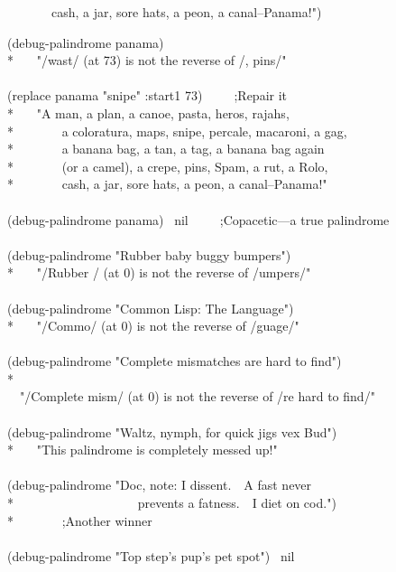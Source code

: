 \begin{newer}
\begin{lisp}
~~~~~~~cash, a jar, sore hats, a peon, a canal--Panama!")
\end{lisp}
\begin{lisp}
(debug-palindrome panama) \\*
~~\EV\ "/wast/ (at 73) is not the reverse of /, pins/" \\
\\
(replace panama "snipe" :start1 73)~~~~~;\textrm{Repair it} \\*
~~\EV\ "A man, a plan, a canoe, pasta, heros, rajahs, \\*
~~~~~~~a coloratura, maps, snipe, percale, macaroni, a gag, \\*
~~~~~~~a banana bag, a tan, a tag, a banana bag again \\*
~~~~~~~(or a camel), a crepe, pins, Spam, a rut, a Rolo, \\*
~~~~~~~cash, a jar, sore hats, a peon, a canal--Panama!" \\
\\
(debug-palindrome panama) \EV\ nil~~~~~;\textrm{Copacetic---a true palindrome} \\
\\
(debug-palindrome "Rubber baby buggy bumpers") \\*
~~\EV\ "/Rubber / (at 0) is not the reverse of /umpers/" \\
\\
(debug-palindrome "Common Lisp: The Language") \\*
~~\EV\ "/Commo/ (at 0) is not the reverse of /guage/" \\
\\
(debug-palindrome "Complete mismatches are hard to find") \\*
~~\EV\ \\
~~"/Complete mism/ (at 0) is not the reverse of /re hard to find/" \\
\\
(debug-palindrome "Waltz, nymph, for quick jigs vex Bud") \\*
~~\EV\ "This palindrome is completely messed up!" \\
\\
(debug-palindrome "Doc, note: I dissent.~~A fast never \\*
~~~~~~~~~~~~~~~~~~~prevents a fatness.~~I diet on cod.") \\*
~~\EV\nil~~~~~;\textrm{Another winner} \\
\\
(debug-palindrome "Top step's pup's pet spot") \EV\ nil
\end{lisp}
\end{newer}



